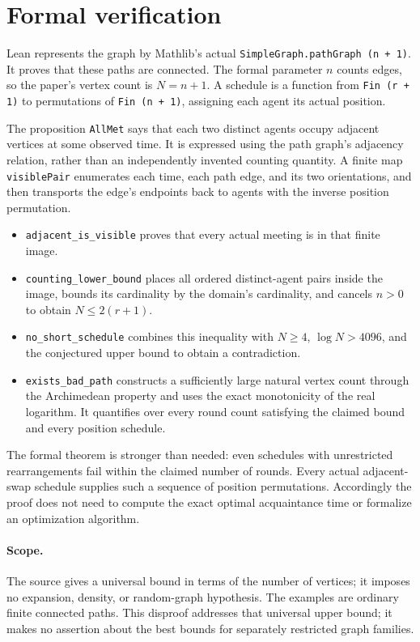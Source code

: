 \documentclass[11pt]{article}
\begin{document}
\newpage
\section{Formal verification}
Lean represents the graph by Mathlib's actual
\texttt{SimpleGraph.pathGraph (n + 1)}. It proves that these paths are
connected. The formal parameter $n$ counts edges, so the paper's vertex
count is $N=n+1$. A schedule is a function from
\texttt{Fin (r + 1)} to permutations of \texttt{Fin (n + 1)}, assigning each
agent its actual position.

The proposition \texttt{AllMet} says that each two distinct agents occupy
adjacent vertices at some observed time. It is expressed using the
path graph's adjacency relation, rather than an independently invented
counting quantity. A finite map \texttt{visiblePair} enumerates each
time, each path edge, and its two orientations, and then transports the
edge's endpoints back to agents with the inverse position permutation.

\begingroup\raggedright
\begin{itemize}
\item \texttt{adjacent\_\allowbreak is\_\allowbreak visible} proves that every actual
meeting is in that finite image.
\item \texttt{counting\_\allowbreak lower\_\allowbreak bound} places all ordered
distinct-agent pairs inside the image, bounds its cardinality by the
domain's cardinality, and cancels $n>0$ to obtain $N\leq2(r+1)$.
\item \texttt{no\_\allowbreak short\_\allowbreak schedule} combines this inequality
with $N\geq4$, $\log N>4096$, and the conjectured upper bound to obtain a
contradiction.
\item \texttt{exists\_\allowbreak bad\_\allowbreak path} constructs a sufficiently
large natural vertex count through the Archimedean property and uses
the exact monotonicity of the real logarithm. It quantifies over every
round count satisfying the claimed bound and every position schedule.
\end{itemize}
\endgroup

The formal theorem is stronger than needed: even schedules with
unrestricted rearrangements fail within the claimed number of rounds.
Every actual adjacent-swap schedule supplies such a sequence of position
permutations. Accordingly the proof does not need to compute the exact
optimal acquaintance time or formalize an optimization algorithm.

\paragraph{Scope.}
The source gives a universal bound in terms of the number of vertices;
it imposes no expansion, density, or random-graph hypothesis. The examples
are ordinary finite connected paths. This disproof addresses that universal
upper bound; it makes no assertion about the best bounds for separately
restricted graph families.
\end{document}
